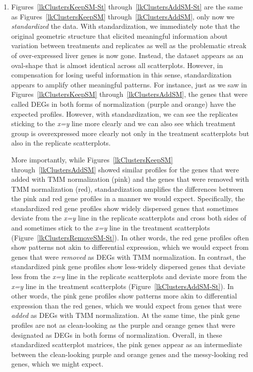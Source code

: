 \documentclass[11pt,a4paper,oldfontcommands,openany]{memoir}
\numberwithin{equation}{section} %
\begin{document}
\begin{enumerate}
\item Figures~\ref{lkClustersKeepSM-St} through~\ref{lkClustersAddSM-St} are the same as Figures~\ref{lkClustersKeepSM} through~\ref{lkClustersAddSM}, only now we \textit{standardized} the data. With standardization, we immediately note that the original geometric structure that elicited meaningful information about variation between treatments and replicates as well as the problematic streak of over-expressed liver genes is now gone. Instead, the dataset appears as an oval-shape that is almost identical across all scatterplots. However, in compensation for losing useful information in this sense, standardization appears to amplify other meaningful patterns. For instance, just as we saw in Figures~\ref{lkClustersKeepSM} through~\ref{lkClustersAddSM}, the genes that were called DEGs in both forms of normalization (purple and orange) have the expected profiles. However, with standardization, we can see the replicates sticking to the \textit{x=y} line more clearly and we can also see which treatment group is overexpressed more clearly not only in the treatment scatterplots but also in the replicate scatterplots.

\vspace{1mm}

More importantly, while Figures~\ref{lkClustersKeepSM} through~\ref{lkClustersAddSM} showed similar profiles for the genes that were added with TMM normalization (pink) and the genes that were removed with TMM normalization (red), standardization amplifies the differences between the pink and red gene profiles in a manner we would expect. Specifically, the standardized red gene profiles show widely dispersed genes that sometimes deviate from the \textit{x=y} line in the replicate scatterplots and cross both sides of and sometimes stick to the \textit{x=y} line in the treatment scatterplots (Figure~\ref{lkClustersRemoveSM-St}). In other words, the red gene profiles often show patterns not akin to differential expression, which we would expect from genes that were \textit{removed} as DEGs with TMM normalization. In contrast, the standardized pink gene profiles show less-widely dispersed genes that deviate less from the \textit{x=y} line in the replicate scatterplots and deviate more from the \textit{x=y} line in the treatment scatterplots (Figure~\ref{lkClustersAddSM-St}). In other words, the pink gene profiles show patterns more akin to differential expression than the red genes, which we would expect from genes that were \textit{added} as DEGs with TMM normalization. At the same time, the pink gene profiles are not as clean-looking as the purple and orange genes that were designated as DEGs in both forms of normalization. Overall, in these standardized scatterplot matrices, the pink genes appear as an intermediate between the clean-looking purple and orange genes and the messy-looking red genes, which we might expect.


\end{enumerate}
\end{document}
